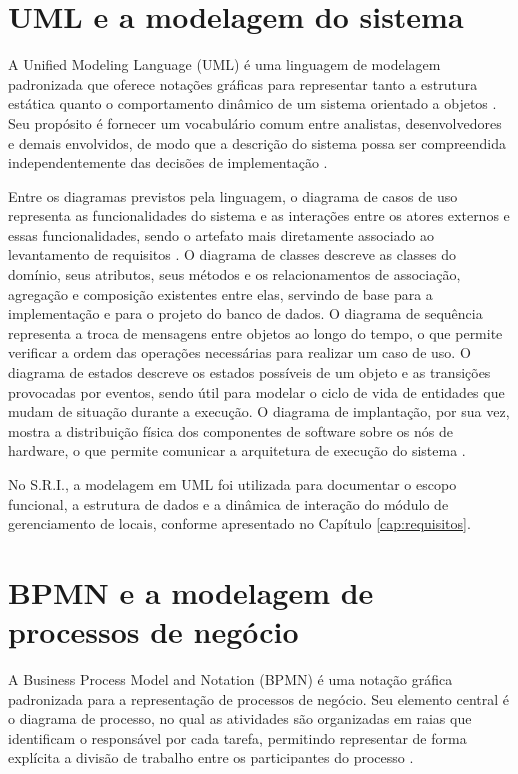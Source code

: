 \section{UML e a modelagem do sistema}

A Unified Modeling Language (UML) é uma linguagem de modelagem padronizada que oferece notações gráficas para representar tanto a estrutura estática quanto o comportamento dinâmico de um sistema orientado a objetos \cite{omg2017uml}. Seu propósito é fornecer um vocabulário comum entre analistas, desenvolvedores e demais envolvidos, de modo que a descrição do sistema possa ser compreendida independentemente das decisões de implementação \cite{guedes2011}.

Entre os diagramas previstos pela linguagem, o diagrama de casos de uso representa as funcionalidades do sistema e as interações entre os atores externos e essas funcionalidades, sendo o artefato mais diretamente associado ao levantamento de requisitos \cite{guedes2011}. O diagrama de classes descreve as classes do domínio, seus atributos, seus métodos e os relacionamentos de associação, agregação e composição existentes entre elas, servindo de base para a implementação e para o projeto do banco de dados. O diagrama de sequência representa a troca de mensagens entre objetos ao longo do tempo, o que permite verificar a ordem das operações necessárias para realizar um caso de uso. O diagrama de estados descreve os estados possíveis de um objeto e as transições provocadas por eventos, sendo útil para modelar o ciclo de vida de entidades que mudam de situação durante a execução. O diagrama de implantação, por sua vez, mostra a distribuição física dos componentes de software sobre os nós de hardware, o que permite comunicar a arquitetura de execução do sistema \cite{omg2017uml}.

No S.R.I., a modelagem em UML foi utilizada para documentar o escopo funcional, a estrutura de dados e a dinâmica de interação do módulo de gerenciamento de locais, conforme apresentado no Capítulo \ref{cap:requisitos}.

\section{BPMN e a modelagem de processos de negócio}

A Business Process Model and Notation (BPMN) é uma notação gráfica padronizada para a representação de processos de negócio. Seu elemento central é o diagrama de processo, no qual as atividades são organizadas em raias que identificam o responsável por cada tarefa, permitindo representar de forma explícita a divisão de trabalho entre os participantes do processo \cite{omg2011bpmn}.

